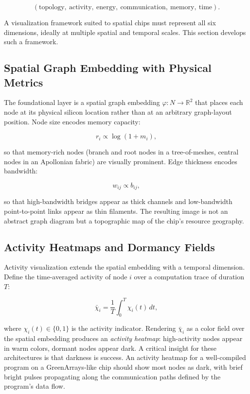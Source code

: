 \documentclass[11pt, a4paper]{article}
\begin{document}
\[
(\text{topology},\ \text{activity},\ \text{energy},\ \text{communication},\ \text{memory},\ \text{time}).
\]

A visualization framework suited to spatial chips must represent all six dimensions,
ideally at multiple spatial and temporal scales. This section develops such a framework.

\subsection{Spatial Graph Embedding with Physical Metrics}

The foundational layer is a spatial graph embedding $\varphi : N \to \mathbb{R}^2$
that places each node at its physical silicon location rather than at an
arbitrary graph-layout position. Node size encodes memory capacity:

\[
r_i \propto \log(1 + m_i),
\]

so that memory-rich nodes (branch and root nodes in a tree-of-meshes, central nodes
in an Apollonian fabric) are visually prominent. Edge thickness encodes bandwidth:

\[
w_{ij} \propto b_{ij},
\]

so that high-bandwidth bridges appear as thick channels and low-bandwidth
point-to-point links appear as thin filaments. The resulting image is not an
abstract graph diagram but a topographic map of the chip's resource geography.

\subsection{Activity Heatmaps and Dormancy Fields}

Activity visualization extends the spatial embedding with a temporal dimension.
Define the time-averaged activity of node $i$ over a computation trace of duration $T$:

\[
\bar{\chi}_i = \frac{1}{T} \int_0^T \chi_i(t)\, dt,
\]

where $\chi_i(t) \in \{0,1\}$ is the activity indicator. Rendering $\bar{\chi}_i$
as a color field over the spatial embedding produces an \emph{activity heatmap}:
high-activity nodes appear in warm colors, dormant nodes appear dark. A critical
insight for these architectures is that darkness is success. An activity heatmap
for a well-compiled program on a GreenArrays-like chip should show most nodes as
dark, with brief bright pulses propagating along the communication paths defined
by the program's data flow.
\end{document}
